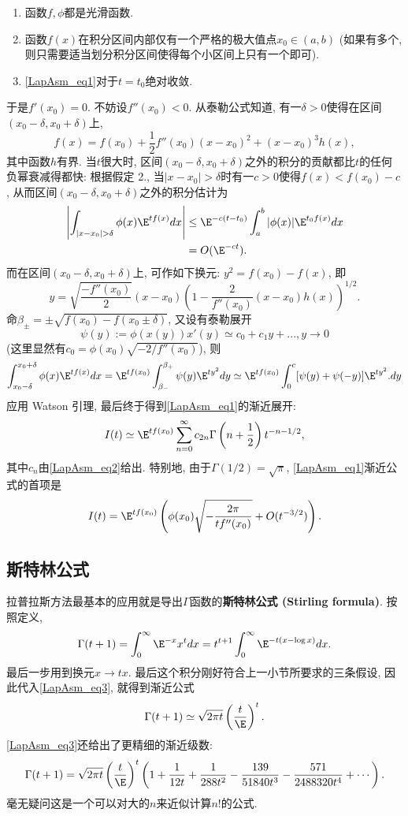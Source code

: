 \begin{enumerate}
\item 函数$f,\phi$都是光滑函数.

\item 函数$f(x)$在积分区间内部仅有一个严格的极大值点$x_0\in(a,b)$ (如果有多个, 则只需要适当划分积分区间使得每个小区间上只有一个即可). 

\item \autoref{LapAsm_eq1}对于$t=t_0$绝对收敛.
\end{enumerate}

于是$f'(x_0)=0$. 不妨设$f''(x_0)<0$. 从泰勒公式知道, 有一$\delta>0$使得在区间$(x_0-\delta,x_0+\delta)$上, 
$$
f(x)=f(x_0)+\frac{1}{2}f''(x_0)(x-x_0)^2+(x-x_0)^3h(x),
$$
其中函数$h$有界. 当$t$很大时, 区间$(x_0-\delta,x_0+\delta)$之外的积分的贡献都比$t$的任何负幂衰减得都快: 根据假定 2., 当$|x-x_0|>\delta$时有一$c>0$使得$f(x)<f(x_0)-c$, 从而区间$(x_0-\delta,x_0+\delta)$之外的积分估计为
$$
\begin{aligned}
\left|\int_{|x-x_0|>\delta}\phi(x)\E^{tf(x)}dx\right|
&\leq \E^{-c(t-t_0)}\int_a^b|\phi(x)|\E^{t_0f(x)}dx\\
&=O(\E^{-ct}).
\end{aligned}
$$
而在区间$(x_0-\delta,x_0+\delta)$上, 可作如下换元: $y^2=f(x_0)-f(x)$, 即
$$
y=\sqrt{\frac{-f''(x_0)}{2}}(x-x_0)\left(1-\frac{2}{f''(x_0)}(x-x_0)h(x)\right)^{1/2}.
$$
命$\beta_{\pm}=\pm\sqrt{f(x_0)-f(x_0\pm\delta)}$, 又设有泰勒展开
\begin{equation}\label{LapAsm_eq2}
\psi(y):=\phi(x(y))x'(y)\simeq c_0+c_1y+...,y\to 0
\end{equation}
(这里显然有$c_0=\phi(x_0)\sqrt{-2/f''(x_0)}$), 则
$$
\int_{x_0-\delta}^{x_0+\delta}\phi(x)\E^{tf(x)}dx
=\E^{tf(x_0)}\int_{\beta_{-}}^{\beta_+}\psi(y)\E^{ty^2}dy
\simeq\E^{tf(x_0)}\int_{0}^{c}[\psi(y)+\psi(-y)]\E^{ty^2}.dy
$$
应用 Watson 引理, 最后终于得到\autoref{LapAsm_eq1}的渐近展开:
\begin{equation}\label{LapAsm_eq3}
I(t)\simeq \E^{tf(x_0)}\sum_{n=0}^\infty c_{2n}\Gamma\left(n+\frac{1}{2}\right)t^{-n-1/2},
\end{equation}
其中$c_n$由\autoref{LapAsm_eq2}给出. 特别地, 由于$\Gamma(1/2)=\sqrt{\pi}$, \autoref{LapAsm_eq1}渐近公式的首项是
$$
I(t)=\E^{tf(x_0)}\left(\phi(x_0)\sqrt{-\frac{2\pi}{tf''(x_0)}}+O(t^{-3/2})\right).
$$

\subsection{斯特林公式}
拉普拉斯方法最基本的应用就是导出$\Gamma$函数的\textbf{斯特林公式 (Stirling formula)}. 按照定义,
$$
\Gamma(t+1)
=\int_0^\infty \E^{-x}x^tdx
=t^{t+1}\int_0^\infty \E^{-t(x-\log x)}dx.
$$
最后一步用到换元$x\to tx$. 最后这个积分刚好符合上一小节所要求的三条假设, 因此代入\autoref{LapAsm_eq3}, 就得到渐近公式
$$
\Gamma(t+1)\simeq\sqrt{2\pi t}\left(\frac{t}{\E}\right)^t.
$$
\autoref{LapAsm_eq3}还给出了更精细的渐近级数:
$$
  \Gamma(t+1)
  =\sqrt{2\pi t}\left({t\over \E}\right)^t
  \left(
   1
   +{1\over12t}
   +{1\over288t^2}
   -{139\over51840t^3}
   -{571\over2488320t^4}
   + \cdots
  \right).
$$
毫无疑问这是一个可以对大的$n$来近似计算$n!$的公式.